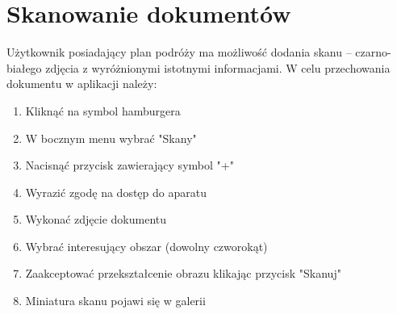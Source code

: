 \documentclass[10pt,twoside,a4paper]{report}
\begin{document}
\section{Skanowanie dokumentów}
Użytkownik posiadający plan podróży ma możliwość dodania skanu – czarno-białego zdjęcia z wyróżnionymi istotnymi informacjami.
W celu przechowania dokumentu w aplikacji należy:
\begin{enumerate}
\item Kliknąć na symbol hamburgera
\item W bocznym menu wybrać "Skany"
\item Nacisnąć przycisk zawierający symbol "+"
\item Wyrazić zgodę na dostęp do aparatu
\item Wykonać zdjęcie dokumentu
\item Wybrać interesujący obszar (dowolny czworokąt)
\item Zaakceptować przekształcenie obrazu klikając przycisk "Skanuj"
\item Miniatura skanu pojawi się w galerii
\end{enumerate}
\end{document}
